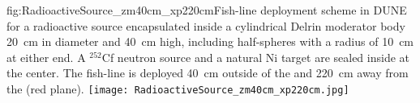 \begin{dunefigure}{fig:RadioactiveSource_zm40cm_xp220cm}{Fish-line deployment scheme in DUNE for a radioactive source encapsulated inside a cylindrical Delrin moderator body \SI{20}{\cm} in diameter and \SI{40}{\cm} high, including half-spheres with a radius of \SI{10}{\cm} at either end. A $^{252}$Cf neutron source and a natural Ni target are sealed inside at the center. The fish-line is deployed \SI{40}{\cm} outside of the  and \SI{220}{\cm} away from the  (red plane).}
\texttt{[image: RadioactiveSource\_zm40cm\_xp220cm.jpg]}
\end{dunefigure}




